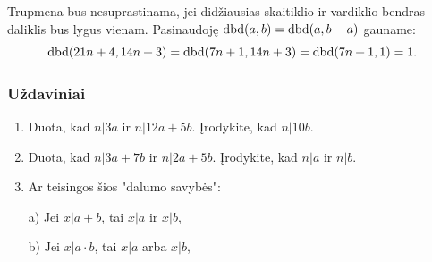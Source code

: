 \begin{sprendimas}
  Trupmena bus nesuprastinama, jei didžiausias skaitiklio ir vardiklio
  bendras daliklis bus lygus vienam. Pasinaudoję $\operatorname{dbd}(a,b) = \operatorname{dbd}(a, b-a)$
  gauname: $$\operatorname{dbd}(21n + 4, 14n + 3) = \operatorname{dbd}(7n+1, 14n+3) = \operatorname{dbd}(7n+1,1) =
  1.$$
\end{sprendimas}


\subsubsection{Uždaviniai}

\begin{enumerate} 
  \item Duota, kad $n|3a$ ir $n|12a+5b$. Įrodykite, kad $n|10b$.  
  \item Duota, kad $n|3a + 7b$ ir $n|2a+5b$.  Įrodykite, kad $n|a$ ir $n|b$.  
  \item Ar teisingos šios "dalumo savybės": 

    a) Jei $x|a + b$, tai $x|a$ ir $x|b$,

    b) Jei $x|a\cdot b$, tai $x|a$ arba $x|b$,


\end{enumerate}

